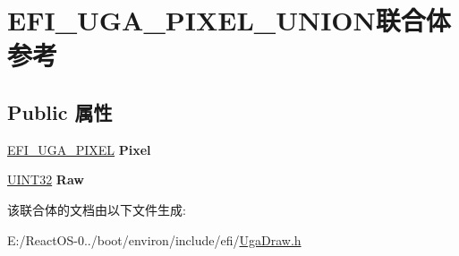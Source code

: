 \hypertarget{union_e_f_i___u_g_a___p_i_x_e_l___u_n_i_o_n}{}\section{E\+F\+I\+\_\+\+U\+G\+A\+\_\+\+P\+I\+X\+E\+L\+\_\+\+U\+N\+I\+O\+N联合体 参考}
\label{union_e_f_i___u_g_a___p_i_x_e_l___u_n_i_o_n}
\subsection*{Public 属性}
\begin{DoxyCompactItemize}
\item 
\mbox{\label{union_e_f_i___u_g_a___p_i_x_e_l___u_n_i_o_n_a374579ea3651dcf2a2c958856f6d2e33}} 
\hyperlink{struct_e_f_i___u_g_a___p_i_x_e_l}{E\+F\+I\+\_\+\+U\+G\+A\+\_\+\+P\+I\+X\+EL} {\bfseries Pixel}
\item 
\mbox{\label{union_e_f_i___u_g_a___p_i_x_e_l___u_n_i_o_n_afa7d54418b4446ab876d6f96d574bd71}} 
\hyperlink{_processor_bind_8h_ae1e6edbbc26d6fbc71a90190d0266018}{U\+I\+N\+T32} {\bfseries Raw}
\end{DoxyCompactItemize}


该联合体的文档由以下文件生成\+:\begin{DoxyCompactItemize}
\item 
E\+:/\+React\+O\+S-\/0../boot/environ/include/efi/\hyperlink{_uga_draw_8h}{Uga\+Draw.\+h}\end{DoxyCompactItemize}
